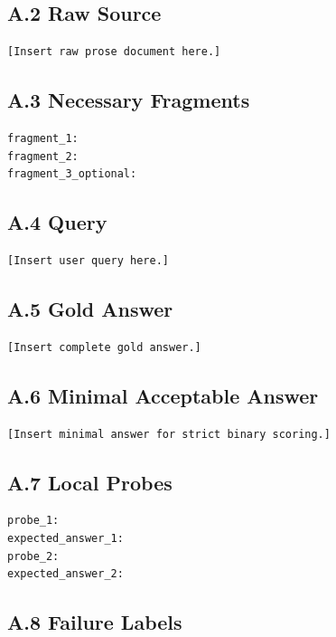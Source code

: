 \documentclass[11pt]{article}
\begin{document}
\subsection*{A.2 Raw Source}

\begin{verbatim}
[Insert raw prose document here.]
\end{verbatim}

\subsection*{A.3 Necessary Fragments}

\begin{verbatim}
fragment_1:
fragment_2:
fragment_3_optional:
\end{verbatim}

\subsection*{A.4 Query}

\begin{verbatim}
[Insert user query here.]
\end{verbatim}

\subsection*{A.5 Gold Answer}

\begin{verbatim}
[Insert complete gold answer.]
\end{verbatim}

\subsection*{A.6 Minimal Acceptable Answer}

\begin{verbatim}
[Insert minimal answer for strict binary scoring.]
\end{verbatim}

\subsection*{A.7 Local Probes}

\begin{verbatim}
probe_1:
expected_answer_1:
probe_2:
expected_answer_2:
\end{verbatim}

\subsection*{A.8 Failure Labels}
\end{document}
